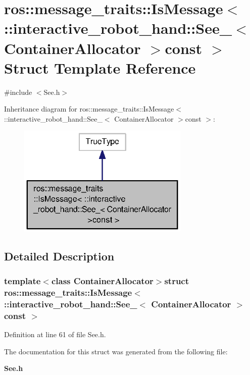 \section{ros\-:\-:message\-\_\-traits\-:\-:Is\-Message$<$ \-:\-:interactive\-\_\-robot\-\_\-hand\-:\-:See\-\_\-$<$ Container\-Allocator $>$const $>$ Struct Template Reference}
\label{structros_1_1message__traits_1_1IsMessage_3_01_1_1interactive__robot__hand_1_1See___3_01ContainerAllocator_01_4const_01_01_4}


{\ttfamily \#include $<$See.\-h$>$}



Inheritance diagram for ros\-:\-:message\-\_\-traits\-:\-:Is\-Message$<$ \-:\-:interactive\-\_\-robot\-\_\-hand\-:\-:See\-\_\-$<$ Container\-Allocator $>$const $>$\-:\nopagebreak
\begin{figure}[H]
\begin{center}
\leavevmode
\includegraphics[width=232pt]{structros_1_1message__traits_1_1IsMessage_3_01_1_1interactive__robot__hand_1_1See___3_01Containeb62e1d89e19963e929cdeeadcb5e9fd2}
\end{center}
\end{figure}


\subsection{Detailed Description}
\subsubsection*{template$<$class Container\-Allocator$>$struct ros\-::message\-\_\-traits\-::\-Is\-Message$<$ \-::interactive\-\_\-robot\-\_\-hand\-::\-See\-\_\-$<$ Container\-Allocator $>$const  $>$}



Definition at line 61 of file See.\-h.



The documentation for this struct was generated from the following file\-:\begin{DoxyCompactItemize}
\item 
{\bf See.\-h}\end{DoxyCompactItemize}
